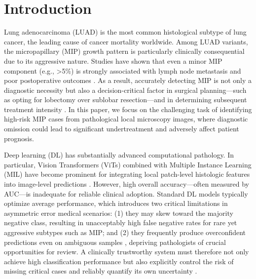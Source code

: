 \documentclass[sigconf,review,anonymous]{acmart}
\theoremstyle{remark}
\begin{document}



\maketitle

\section{Introduction}

Lung adenocarcinoma (LUAD) is the most common histological subtype of lung cancer, the leading cause of cancer mortality worldwide. Among LUAD variants, the micropapillary (MIP) growth pattern is particularly clinically consequential due to its aggressive nature. Studies have shown that even a minor MIP component (e.g., >5\%) is strongly associated with lymph node metastasis and poor postoperative outcomes \cite{caso2020underlying, dai2017tumor}. As a result, accurately detecting MIP is not only a diagnostic necessity but also a decision-critical factor in surgical planning—such as opting for lobectomy over sublobar resection—and in determining subsequent treatment intensity \cite{dai2017tumor}. In this paper, we focus on the challenging task of identifying high-risk MIP cases from pathological local microscopy images, where diagnostic omission could lead to significant undertreatment and adversely affect patient prognosis.


Deep learning (DL) has substantially advanced computational pathology. In particular, Vision Transformers (ViTs) \cite{dosovitskiy2020image} combined with Multiple Instance Learning (MIL) \cite{ilse2018attention} have become prominent for integrating local patch-level histologic features into image-level predictions \cite{campanella2019clinical, lu2021data, ilse2018attention}. However, high overall accuracy—often measured by AUC—is inadequate for reliable clinical adoption. Standard DL models typically optimize average performance, which introduces two critical limitations in asymmetric error medical scenarios: (1) they may skew toward the majority negative class, resulting in unacceptably high false negative rates for rare yet aggressive subtypes such as MIP; and (2) they frequently produce overconfident predictions even on ambiguous samples \cite{hendrycks2016baseline}, depriving pathologists of crucial opportunities for review. A clinically trustworthy system must therefore not only achieve high classification performance but also explicitly control the risk of missing critical cases and reliably quantify its own uncertainty \cite{dvijotham2023enhancing}.
\end{document}

